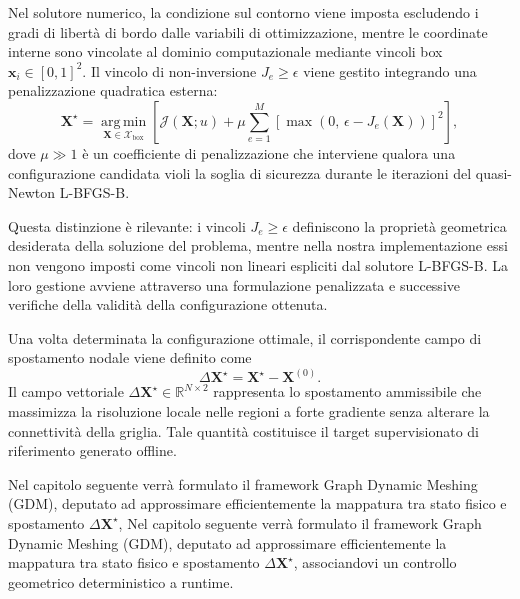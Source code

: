 Nel solutore numerico, la condizione sul contorno viene imposta escludendo i gradi di libertà di bordo dalle variabili di ottimizzazione, mentre le coordinate interne sono vincolate al dominio computazionale mediante vincoli box $\mathbf{x}_i \in [0,1]^2$. Il vincolo di non-inversione $J_e \geq \epsilon$ viene gestito integrando una penalizzazione quadratica esterna:
\begin{equation}
\mathbf{X}^{\star}
=
\underset{\mathbf{X}\in\mathcal{X}_{\mathrm{box}}}{\operatorname{arg\,min}}
\left[
\mathcal{J}(\mathbf{X};u)
+
\mu \sum_{e=1}^{M} \left[ \max\left(0,\, \epsilon - J_e(\mathbf{X})\right) \right]^2
\right],
\label{eq:oracle_penalized}
\end{equation}
dove $\mu \gg 1$ è un coefficiente di penalizzazione che interviene qualora una configurazione candidata violi la soglia di sicurezza durante le iterazioni del quasi-Newton L-BFGS-B.

Questa distinzione è rilevante: i vincoli $J_e\geq\epsilon$ definiscono la proprietà geometrica desiderata della soluzione del problema, mentre nella nostra implementazione essi non vengono imposti come vincoli non lineari espliciti dal solutore L-BFGS-B. La loro gestione avviene attraverso una formulazione penalizzata e successive verifiche della validità della configurazione ottenuta.

Una volta determinata la configurazione ottimale, il corrispondente campo di spostamento nodale viene definito come
\begin{equation}
\Delta\mathbf{X}^{\star}
=
\mathbf{X}^{\star}
-
\mathbf{X}^{(0)}.
\label{eq:oracle_displacement}
\end{equation}
Il campo vettoriale $\Delta\mathbf{X}^{\star} \in \mathbb{R}^{N \times 2}$ rappresenta lo spostamento ammissibile che massimizza la risoluzione locale nelle regioni a forte gradiente senza alterare la connettività della griglia. Tale quantità costituisce il target supervisionato di riferimento generato offline. 

Nel capitolo seguente verrà formulato il framework Graph Dynamic Meshing (GDM), deputato ad approssimare efficientemente la mappatura tra stato fisico e spostamento $\Delta\mathbf{X}^{\star}$, Nel capitolo seguente verrà formulato il framework Graph Dynamic Meshing (GDM), deputato ad approssimare efficientemente la mappatura tra stato fisico e spostamento $\Delta\mathbf{X}^{\star}$, associandovi un controllo geometrico deterministico a runtime.
